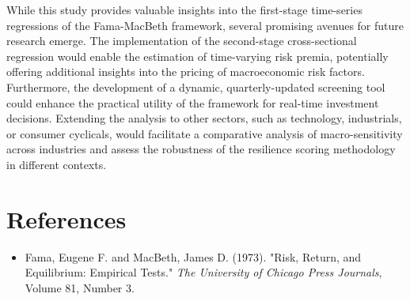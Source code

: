 \documentclass[12pt]{article}
\begin{document}
While this study provides valuable insights into the first-stage time-series regressions of the Fama-MacBeth framework, several promising avenues for future research emerge. The implementation of the second-stage cross-sectional regression would enable the estimation of time-varying risk premia, potentially offering additional insights into the pricing of macroeconomic risk factors. Furthermore, the development of a dynamic, quarterly-updated screening tool could enhance the practical utility of the framework for real-time investment decisions. Extending the analysis to other sectors, such as technology, industrials, or consumer cyclicals, would facilitate a comparative analysis of macro-sensitivity across industries and assess the robustness of the resilience scoring methodology in different contexts.

\section*{References}
\begin{itemize}
    \item Fama, Eugene F. and MacBeth, James D. (1973). "Risk, Return, and Equilibrium: Empirical Tests." \textit{The University of Chicago Press Journals}, Volume 81, Number 3.
\end{itemize}
\end{document}
